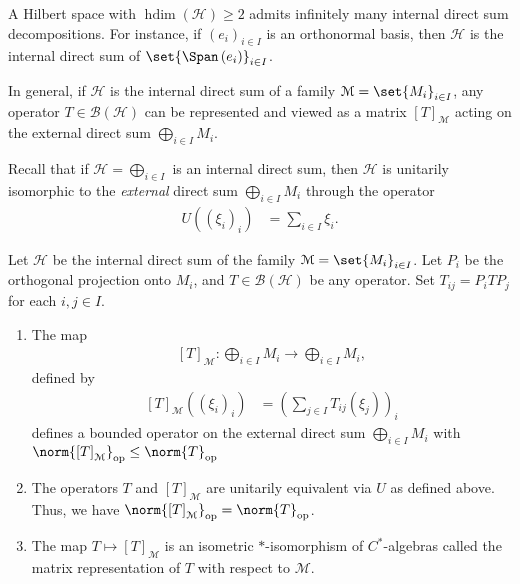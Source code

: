 \documentclass[10pt]{mypackage}
\DeclareMathOperator{\hdim}{hdim}
\begin{document}
A Hilbert space with $\hdim\left(\mathcal{H}\right) \geq 2$ admits infinitely many internal direct sum decompositions. For instance, if $\left(e_i\right)_{i\in I}$ is an orthonormal basis, then $\mathcal{H}$ is the internal direct sum of $\set{\Span\left(e_i\right)}_{i\in I}$.\newline

In general, if $\mathcal{H}$ is the internal direct sum of a family $\mathcal{M} = \set{M_i}_{i\in I}$, any operator $T\in \mathcal{B}\left(\mathcal{H}\right)$ can be represented and viewed as a matrix $\left[T\right]_{\mathcal{M}}$ acting on the external direct sum $\bigoplus_{i\in I}M_i$.\newline

Recall that if $\mathcal{H} = \bigoplus_{i\in I}$ is an internal direct sum, then $\mathcal{H}$ is unitarily isomorphic to the \textit{external} direct sum $\bigoplus_{i\in I}M_i$ through the operator
\begin{align*}
  U\left(\left(\xi_i\right)_i\right) &= \sum_{i\in I}\xi_i.
\end{align*}
\begin{proposition}
  Let $\mathcal{H}$ be the internal direct sum of the family $\mathcal{M} = \set{M_i}_{i\in I}$. Let $P_i$ be the orthogonal projection onto $M_i$, and $T\in \mathcal{B}\left(\mathcal{H}\right)$ be any operator. Set $T_{ij} = P_iTP_j$ for each $i,j\in I$.
  \begin{enumerate}[(1)]
    \item The map
      \begin{align*}
        \left[T\right]_{\mathcal{M}}: \bigoplus_{i\in I}M_i \rightarrow \bigoplus_{i\in I} M_i,
      \end{align*}
      defined by
      \begin{align*}
        \left[T\right]_{\mathcal{M}}\left(\left(\xi_i\right)_i\right) &= \left(\sum_{j\in I}T_{ij}\left(\xi_j\right)\right)_i
      \end{align*}
      defines a bounded operator on the external direct sum $\bigoplus_{i\in I}M_i$ with $\norm{\left[T\right]_{\mathcal{M}}}_{\text{op}} \leq \norm{T}_{\text{op}}$
    \item The operators $T$ and $\left[T\right]_{\mathcal{M}}$ are unitarily equivalent via $U$ as defined above. Thus, we have $\norm{\left[T\right]_{\mathcal{M}}}_{\text{op}} = \norm{T}_{\text{op}}$.
    \item The map $T \mapsto \left[T\right]_{\mathcal{M}}$ is an isometric $\ast$-isomorphism of $C^{\ast}$-algebras called the matrix representation of $T$ with respect to $\mathcal{M}$.
  \end{enumerate}
\end{proposition}
\end{document}
